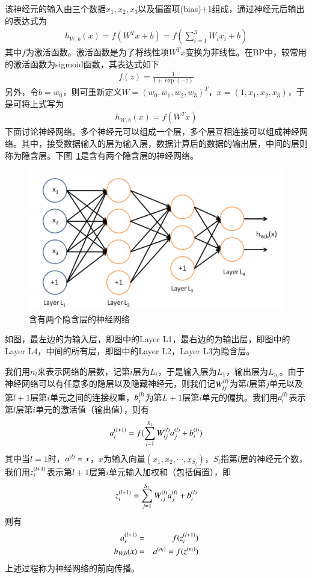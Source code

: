 该神经元的输入由三个数据$x_1,x_2,x_3$以及偏置项(bias)+1组成，通过神经元后输出的表达式为
\begin{eqnarray}
h_{W,b}(x)=f(W^Tx+b)=f(\sum_{i=1}^3 W_ix_i+b)
\end{eqnarray}
其中$f$为激活函数。激活函数是为了将线性项$W^Tx$变换为非线性。在BP中，较常用的激活函数为sigmoid函数，其表达式如下
\begin{eqnarray}
f(z)=\frac{1}{1+\exp(-z)}
\end{eqnarray}
另外，令$b=w_0$，则可重新定义$W=(w_0,w_1,w_2,w_3)^T$，$x=(1,x_1,x_2,x_3)$，于是可将上式写为
\begin{eqnarray}
h_{W,b}(x)=f(W^Tx)
\end{eqnarray}
下面讨论神经网络。多个神经元可以组成一个层，多个层互相连接可以组成神经网络。其中，接受数据输入的层为输入层，数据计算后的数据的输出层，中间的层则称为隐含层。下图~\ref{fig:bp2}是含有两个隐含层的神经网络。
\begin{figure}[htb]
\centering
\includegraphics[scale=0.5]{../figures/NN2.png}
\caption{含有两个隐含层的神经网络}
\label{fig:bp2}
\end{figure}
如图，最左边的为输入层，即图中的Layer L1，最右边的为输出层，即图中的Layer L4，中间的所有层，即图中的Layer L2，Layer L3为隐含层。

我们用$n_l$来表示网络的层数，记第$i$层为$L_i$，于是输入层为$L_1$，输出层为$L_{n_l}$。由于神经网络可以有任意多的隐层以及隐藏神经元，则我们记$\samplet{W}{l}{ij}$为第$l$层第$j$单元以及第$l+1$层第$i$单元之间的连接权重，$\samplet{b}{l}{i	}$为第$L+1$层第$i$单元的偏执。我们用$\samplet{a}{l}{i}$表示第$l$层第$i$单元的激活值（输出值），则有
\begin{eqnarray}
\samplet{a}{l+1}{i}=f(\sum_{j=1}^{S_l}\samplet{W}{l}{ij}\samplet{a}{l}{j}+\samplet{b}{l}{i})
\end{eqnarray}
其中当$l=1$时，$\sample{a}{l}=x$，$x$为输入向量$(x_1,x_2,\cdots,x_{S_l})$，$S_l$指第$l$层的神经元个数，我们用$\samplet{z}{l+1}{i}$表示第$l+1$层第$i$单元输入加权和（包括偏置），即
\begin{eqnarray}
\samplet{z}{l+1}{i}=\sum_{j=1}^{S_t}\samplet{W}{l}{ij}\samplet{a}{l}{j}+\samplet{b}{l}{i}
\end{eqnarray}
则有
\begin{eqnarray}
\samplet{a}{l+1}{i}&=&f(\samplet{z}{l+1}{i})\\
h_{W,b}(x)&=&\sample{a}{n_l}=f(\sample{z}{n_l})
\end{eqnarray}
上述过程称为神经网络的前向传播。

